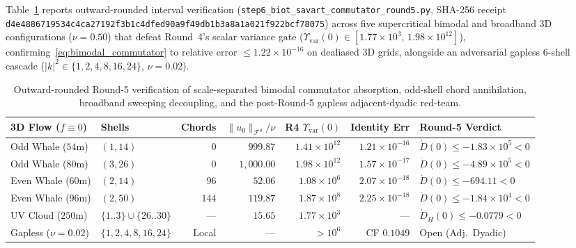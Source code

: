 \documentclass[11pt]{article}
\theoremstyle{plain}
\theoremstyle{definition}
\begin{document}
Table~\ref{tab:step6} reports outward-rounded interval verification (\texttt{step6\_biot\_savart\_\allowbreak commutator\_round5.py}, SHA-256 receipt \texttt{d4e4886719534c4c\allowbreak a27192f3b1c4dfed\allowbreak 90a9f49db1b3a8a1\allowbreak a021f922bcf78075}) across five supercritical bimodal and broadband 3D configurations ($\nu = 0.50$) that defeat Round~4's scalar variance gate ($\Upsilon_{\mathrm{var}}(0) \in [1.77 \times 10^3, \, 1.98 \times 10^{12}]$), confirming~\eqref{eq:bimodal_commutator} to relative error $\le 1.22 \times 10^{-16}$ on dealiased 3D grids, alongside an adversarial gapless 6-shell cascade ($|k|^2 \in \{1,2,4,8,16,24\}$, $\nu = 0.02$).

\begin{table}[htbp]
\centering
\caption{Outward-rounded Round-5 verification of scale-separated bimodal commutator absorption, odd-shell chord annihilation, broadband sweeping decoupling, and the post-Round-5 gapless adjacent-dyadic red-team.}
\label{tab:step6}
\vspace{4pt}
{\footnotesize\setlength{\tabcolsep}{3.2pt}
\begin{tabular}{@{}llrrrrl@{}}
\toprule
3D Flow ($f \equiv 0$) & Shells & Chords & $\|u_0\|_{\mathcal{F}^0}/\nu$ & R4 $\Upsilon_{\mathrm{var}}(0)$ & Identity Err & Round-5 Verdict \\
\midrule
Odd Whale ($54$m)      & $(1, 14)$ & $0$   & $999.87$     & $1.41 \times 10^{12}$ & $1.21 \times 10^{-16}$ & $\dot{D}(0) \le -1.83 \times 10^5 < 0$ \\
Odd Whale ($80$m)      & $(3, 26)$ & $0$   & $1{,}000.00$ & $1.98 \times 10^{12}$ & $1.57 \times 10^{-17}$ & $\dot{D}(0) \le -4.89 \times 10^5 < 0$ \\
Even Whale ($60$m)     & $(2, 14)$ & $96$  & $52.06$      & $1.08 \times 10^6$    & $2.07 \times 10^{-18}$ & $\dot{D}(0) \le -694.11 < 0$ \\
Even Whale ($96$m)     & $(2, 50)$ & $144$ & $119.87$     & $1.87 \times 10^8$    & $2.25 \times 10^{-18}$ & $\dot{D}(0) \le -1.84 \times 10^4 < 0$ \\
UV Cloud ($250$m)      & $\{1..3\}\cup\{26..30\}$ & --- & $15.65$ & $1.77 \times 10^3$ & --- & $\dot{D}_H(0) \le -0.0779 < 0$ \\
Gapless ($\nu = 0.02$) & $\{1,2,4,8,16,24\}$ & Local & --- & $> 10^6$ & CF $0.1049$ & Open (Adj.\ Dyadic) \\
\bottomrule
\end{tabular}}
\end{table}
\end{document}
